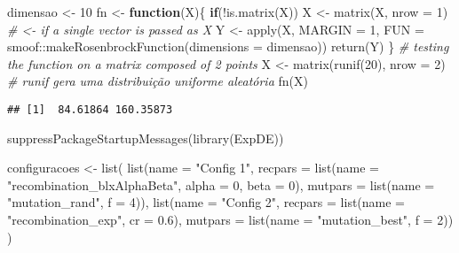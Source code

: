\documentclass[
]{article}
\newenvironment{Shaded}{\begin{snugshade}}{\end{snugshade}}
\newcommand{\AttributeTok}[1]{\textcolor[rgb]{0.77,0.63,0.00}{#1}}
\newcommand{\CommentTok}[1]{\textcolor[rgb]{0.56,0.35,0.01}{\textit{#1}}}
\newcommand{\ControlFlowTok}[1]{\textcolor[rgb]{0.13,0.29,0.53}{\textbf{#1}}}
\newcommand{\DecValTok}[1]{\textcolor[rgb]{0.00,0.00,0.81}{#1}}
\newcommand{\FloatTok}[1]{\textcolor[rgb]{0.00,0.00,0.81}{#1}}
\newcommand{\FunctionTok}[1]{\textcolor[rgb]{0.00,0.00,0.00}{#1}}
\newcommand{\NormalTok}[1]{#1}
\newcommand{\OtherTok}[1]{\textcolor[rgb]{0.56,0.35,0.01}{#1}}
\newcommand{\SpecialCharTok}[1]{\textcolor[rgb]{0.00,0.00,0.00}{#1}}
\newcommand{\StringTok}[1]{\textcolor[rgb]{0.31,0.60,0.02}{#1}}
\begin{document}
\begin{Shaded}
\begin{Highlighting}[]
\NormalTok{dimensao }\OtherTok{\textless{}{-}} \DecValTok{10}
\NormalTok{fn }\OtherTok{\textless{}{-}} \ControlFlowTok{function}\NormalTok{(X)\{}
  \ControlFlowTok{if}\NormalTok{(}\SpecialCharTok{!}\FunctionTok{is.matrix}\NormalTok{(X)) X }\OtherTok{\textless{}{-}} \FunctionTok{matrix}\NormalTok{(X, }\AttributeTok{nrow =} \DecValTok{1}\NormalTok{) }\CommentTok{\# \textless{}{-} if a single vector is passed as X}
\NormalTok{  Y }\OtherTok{\textless{}{-}} \FunctionTok{apply}\NormalTok{(X, }\AttributeTok{MARGIN =} \DecValTok{1}\NormalTok{,}
             \AttributeTok{FUN =}\NormalTok{ smoof}\SpecialCharTok{::}\FunctionTok{makeRosenbrockFunction}\NormalTok{(}\AttributeTok{dimensions =}\NormalTok{ dimensao))}
  \FunctionTok{return}\NormalTok{(Y)}
\NormalTok{\}}
\CommentTok{\# testing the function on a matrix composed of 2 points}
\NormalTok{X }\OtherTok{\textless{}{-}} \FunctionTok{matrix}\NormalTok{(}\FunctionTok{runif}\NormalTok{(}\DecValTok{20}\NormalTok{), }\AttributeTok{nrow =} \DecValTok{2}\NormalTok{) }\CommentTok{\# runif gera uma distribuição uniforme aleatória}
\FunctionTok{fn}\NormalTok{(X)}
\end{Highlighting}
\end{Shaded}

\begin{verbatim}
## [1]  84.61864 160.35873
\end{verbatim}

\begin{Shaded}
\begin{Highlighting}[]
\FunctionTok{suppressPackageStartupMessages}\NormalTok{(}\FunctionTok{library}\NormalTok{(ExpDE))}


\NormalTok{configuracoes }\OtherTok{\textless{}{-}} \FunctionTok{list}\NormalTok{(}
  \FunctionTok{list}\NormalTok{(}\AttributeTok{name =} \StringTok{"Config 1"}\NormalTok{, }\AttributeTok{recpars =} \FunctionTok{list}\NormalTok{(}\AttributeTok{name =} \StringTok{"recombination\_blxAlphaBeta"}\NormalTok{, }\AttributeTok{alpha =} \DecValTok{0}\NormalTok{, }\AttributeTok{beta =} \DecValTok{0}\NormalTok{), }\AttributeTok{mutpars =} \FunctionTok{list}\NormalTok{(}\AttributeTok{name =} \StringTok{"mutation\_rand"}\NormalTok{, }\AttributeTok{f =} \DecValTok{4}\NormalTok{)),}
  \FunctionTok{list}\NormalTok{(}\AttributeTok{name =} \StringTok{"Config 2"}\NormalTok{, }\AttributeTok{recpars =} \FunctionTok{list}\NormalTok{(}\AttributeTok{name =} \StringTok{"recombination\_exp"}\NormalTok{, }\AttributeTok{cr =} \FloatTok{0.6}\NormalTok{), }\AttributeTok{mutpars =} \FunctionTok{list}\NormalTok{(}\AttributeTok{name =} \StringTok{"mutation\_best"}\NormalTok{, }\AttributeTok{f =} \DecValTok{2}\NormalTok{))}
\NormalTok{)}
\end{Highlighting}
\end{Shaded}
\end{document}
